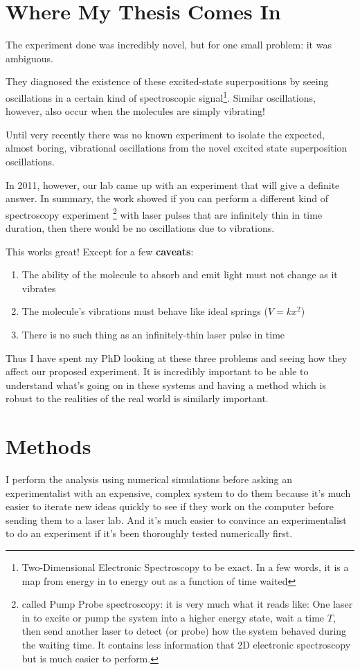 \section{Where My Thesis Comes In}
The experiment done was incredibly novel, but for one small problem: it was ambiguous.

They diagnosed the existence of these excited-state superpositions by seeing oscillations in a certain kind of spectroscopic signal\footnote{Two-Dimensional Electronic Spectroscopy to be exact.  In a few words, it is a map from energy in to energy out as a function of time waited}.  Similar oscillations, however, also occur when the molecules are simply vibrating!

Until very recently there was no known experiment to isolate the expected, almost boring, vibrational oscillations from the novel excited state superposition oscillations.

In 2011, however, our lab came up with an experiment that will give a definite answer\cite{witness}.  In summary, the work showed if you can perform a different kind of spectroscopy experiment \footnote{called Pump Probe spectroscopy: it is very much what it reads like: One laser in to excite or pump the system into a higher energy state, wait a time $T$, then send another laser to detect (or probe) how the system behaved during the waiting time.  It contains less information that 2D electronic spectroscopy but is much easier to perform.} with laser pulses that are infinitely thin in time duration, then there would be no oscillations due to vibrations.

This works great!  Except for a few \textbf{caveats}:
\begin{enumerate}
  \item The ability of the molecule to absorb and emit light must not change as it vibrates
  \item The molecule's vibrations must behave like ideal springs ($V = k x^2$)
  \item There is no such thing as an infinitely-thin laser pulse in time
\end{enumerate}

Thus I have spent my PhD looking at these three problems and seeing how they affect our proposed experiment.  It is incredibly important to be able to understand what's going on in these systems and having a method which is robust to the realities of the real world is similarly important.

\section{Methods}
I perform the analysis using numerical simulations before asking an experimentalist with an expensive, complex system to do them because it's much easier to iterate new ideas quickly to see if they work on the computer before sending them to a laser lab.  And it's much easier to convince an experimentalist to do an experiment if it's been thoroughly tested numerically first.

